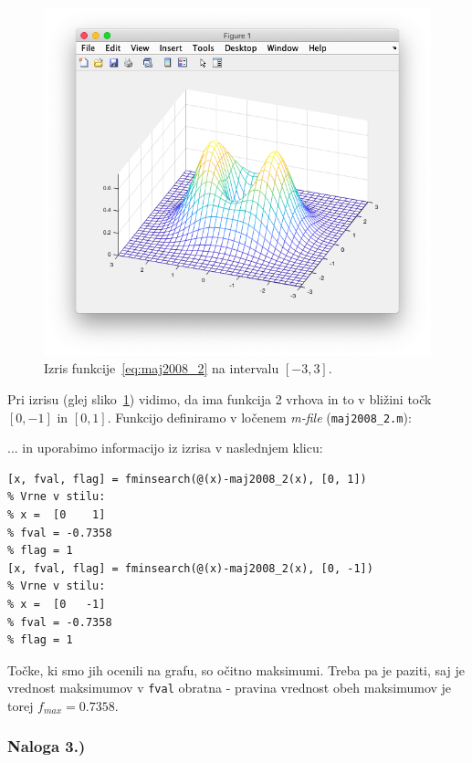 \documentclass[a4paper,11pt]{article}
\begin{document}
\begin{figure}[hbt]
\centering
\includegraphics[scale=.4]{images/nal2_maj2008_plot.png}
\caption{Izris funkcije~\ref{eq:maj2008_2} na intervalu $[-3, 3]$.}
\label{img:maj2008_2_plot}
\end{figure}

Pri izrisu (glej sliko~\ref{img:maj2008_2_plot}) vidimo, da ima funkcija 2 vrhova in to v bližini točk $[0, -1]$ in $[0, 1]$. Funkcijo definiramo v ločenem \textit{m-file} (\texttt{maj2008\_2.m}):
 
... in uporabimo informacijo iz izrisa v naslednjem klicu:
\begin{lstlisting}
[x, fval, flag] = fminsearch(@(x)-maj2008_2(x), [0, 1])
% Vrne v stilu:
% x =  [0    1]
% fval = -0.7358
% flag = 1
[x, fval, flag] = fminsearch(@(x)-maj2008_2(x), [0, -1])
% Vrne v stilu:
% x =  [0   -1]
% fval = -0.7358
% flag = 1
\end{lstlisting}
Točke, ki smo jih ocenili na grafu, so očitno maksimumi. Treba pa je paziti, saj je vrednost maksimumov v \texttt{fval} obratna - pravina vrednost obeh maksimumov je torej $f_{max} = 0.7358$.


\subsubsection{Naloga 3.)}
\label{task:maj2008_3}
\end{document}
